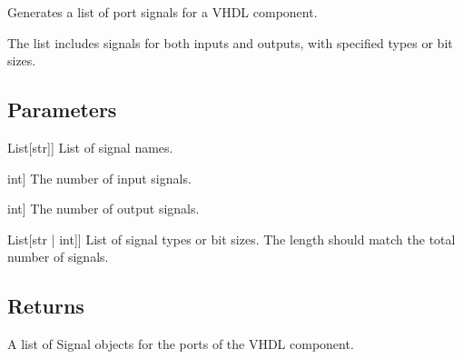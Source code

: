 \documentclass[letterpaper,10pt,english]{sphinxmanual}
\begin{document}

\begin{fulllineitems}
\label{\detokenize{functions:functions.port_signals_list}}
\pysigstartsignatures
{}
\pysigstopsignatures
\sphinxAtStartPar
Generates a list of port signals for a VHDL component.

\sphinxAtStartPar
The list includes signals for both inputs and outputs, with specified types or bit sizes.


\subsection{Parameters}
\label{\detokenize{functions:id4}}\begin{description}
\sphinxlineitem{signal\_names}{[}List{[}str{]}{]}
\sphinxAtStartPar
List of signal names.

\sphinxlineitem{number\_of\_inputs}{[}int{]}
\sphinxAtStartPar
The number of input signals.

\sphinxlineitem{number\_of\_outputs}{[}int{]}
\sphinxAtStartPar
The number of output signals.

\sphinxlineitem{types\_or\_number\_of\_bits}{[}List{[}str | int{]}{]}
\sphinxAtStartPar
List of signal types or bit sizes. The length should match the total number of signals.

\end{description}


\subsection{Returns}
\label{\detokenize{functions:id5}}\begin{description}
\sphinxAtStartPar
A list of Signal objects for the ports of the VHDL component.


\end{description}
\end{fulllineitems}
\end{document}
